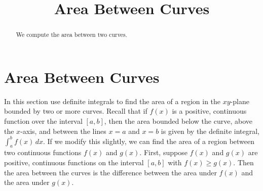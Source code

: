 \documentclass{ximera}
\title{Area Between Curves}
\begin{document}
\begin{abstract}
We compute the area between two curves.
\end{abstract}

\maketitle

\section{Area Between Curves}

In this section use definite integrals to find the area of a region 
in the $xy$-plane bounded by two or more curves. Recall that if $f(x)$ is a positive, continuous function 
over the interval $[a, b]$, then the area bounded below the curve, above the $x$-axis, and between the lines $x = a$
and $x = b$ is given by the definite integral, $\int_a^b f(x) \, dx$. If we modify this slightly, 
we can find the area of a region between two continuous functions $f(x)$ and $g(x)$. First, suppose $f(x)$ and $g(x)$
are positive, continuous functions on the interval $[a,b]$ with $f(x) \geq g(x)$.
Then the area between the curves is the difference between the area under $f(x)$ and the area under $g(x)$.


\begin{center}
\end{center}
\end{document}

